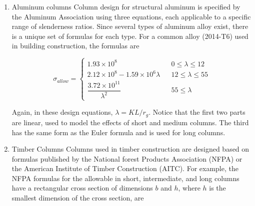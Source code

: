 \documentclass[a4paper,openany,12pt]{book}
\begin{document}
{{\begin{enumerate}
 L2.5cm C2cm C2cm C2cm C2cm C2cm W section \& \(r_g\) (mm) \& \(A\) (mm\(^2\)) \&
Slenderness Ratio \& \(\sigma_{allow}\) (MPa) \& \(P_{allow}\) (kN)\\
W360 \(\times\) 39 \& 27.5 \& 4960 \& 218 \& -63 \& -314\\
W360 \(\times\) 45 \& 37.8 \& 5710 \& 159 \& 32 \& 183\\
W200 \(\times\) 36 \& 40.9 \& 4570 \& 147 \& 46 \& 211\\
W150 \(\times\) 22 \& 36.8 \& 2860 \& 163 \& 26.6 \& 76\\

At first, we find that our original choice W360 \(\times\) 39 does not
have the proper slenderness ratio (218 was higher than 200). So we pick
a next larger one, W360 \(\times\) 45, but find that it can support much
larger load than required. Subsequently, by process of elimination, we
find the lightest section that still support sufficient compressive load
is the W150 \(\times\) 22.

\item Aluminum columns
\label{sec:org8b4c1cd}
Column design for structural aluminum is specified by the Aluminum
Association using three equations, each applicable to a specific range
of slenderness ratios. Since several types of aluminum alloy exist,
there is a unique set of formulas for each type. For a common alloy
(2014-T6) used in building construction, the formulas are

$$\sigma_{allow} = \left\{
    \begin{array}{lcc}
      1.93 \times 10^8 &&  0 \leqslant \lambda \leqslant 12 \\[20pt] 
      2.12 \times 10^8 - 1.59 \times 10^6 \lambda && 12 \leqslant \lambda \leqslant 55 \\[20pt]
      \dfrac{3.72 \times 10^{11}}{ \lambda^2 } && 55 \leqslant \lambda 
    \end{array} \right.$$

Again, in these design equations, \(\lambda = KL/r_g\). Notice that the
first two parts are linear, used to model the effects of short and
medium columns. The third has the same form as the Euler formula and is
used for long columns.


\item Timber Columns
\label{sec:org6847604}
Columns used in timber construction are designed based on formulas
published by the National forest Products Association (NFPA) or the
American Institute of Timber Construction (AITC). For example, the NFPA
formulas for the allowable in short, intermediate, and long columns have
a rectangular cross section of dimensions \(b\) and \(h\), where \(h\) is the
smallest dimension of the cross section, are


\end{enumerate}}}
\end{document}

